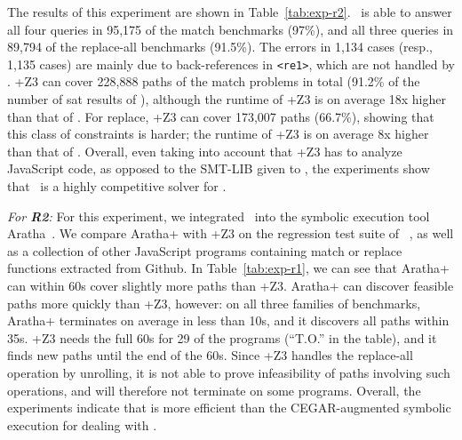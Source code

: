 The results of this experiment are shown in
Table~\ref{tab:exp-r2}. \ostrich\ is able to answer all four queries
in 95,175 of the match benchmarks (97\%), and all three queries in
89,794 of the replace-all benchmarks (91.5\%). The errors in 1,134
cases (resp., 1,135 cases) are mainly due to back-references in
\verb!<re1>!, which are not handled by \ostrich. \expose{}+Z3 can
cover 228,888 paths of the match problems in total (91.2\% of the
number of sat results of \ostrich), although the runtime of
\expose{}+Z3 is on average 18x higher than that of \ostrich. For
replace, \expose{}+Z3 can cover 173,007 paths (66.7\%), showing that
this class of constraints is harder; the runtime of \expose{}+Z3 is on
average 8x higher than that of \ostrich.  Overall, even taking into
account that \expose{}+Z3 has to analyze JavaScript code, as opposed
to the SMT-LIB given to \ostrich, the experiments show that \ostrich\
is a highly competitive solver for \regexps.

\smallskip
{\em For \textbf{R2}:} For this experiment,
we  integrated \ostrich\ into the symbolic
execution tool Aratha~\cite{aratha}.  We compare Aratha+{\ostrich} with
\expose{}+Z3 on the regression test suite of \expose{}~\cite{DBLP:conf/spin/LoringMK17},
as well as a collection of other JavaScript programs containing match or replace
functions extracted from Github. In
Table~\ref{tab:exp-r1}, we can see that Aratha+{\ostrich} can within
60s cover slightly more paths than \expose{}+Z3. Aratha+{\ostrich} can
discover feasible paths more quickly than \expose{}+Z3, however: on
all three families of benchmarks, Aratha+{\ostrich} terminates on
average in less than 10s, and it discovers all paths 
within 35s. \expose{}+Z3 needs the full 60s for
29 of the programs (``T.O.'' in the table),
and it finds new paths until the end of the 60s. Since \expose{}+Z3
handles the replace-all operation by unrolling, it is not able to
prove infeasibility of paths involving such operations, and will
therefore not terminate on some programs.
Overall, the experiments indicate that {\ostrich} is more
efficient than the CEGAR-augmented symbolic execution for dealing
with \regexps.



